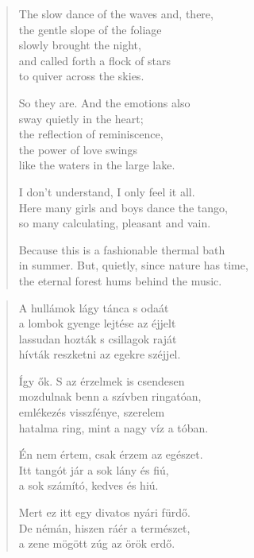 \documentclass[11pt]{book}
\newcommand*{\centeredornament}{\centerline{\pgfornament[width=6cm]{88}}}
\begin{document}
\begin{verse}
  The slow dance of the waves and, there, \\
  the gentle slope of the foliage \\
  slowly brought the night, \\
  and called forth a flock of stars  \\
  to quiver across the skies.

  So they are. And the emotions also \\
  sway quietly in the heart; \\
  the reflection of reminiscence, \\
  the power of love swings \\
  like the waters in the large lake.

  I don't understand, I only feel it all. \\
  Here many girls and boys dance the tango, \\
  so many calculating, pleasant and vain.

  Because this is a fashionable thermal bath \\
  in summer. But, quietly, since nature has time,\hspace*{-1mm} \\
  the eternal forest hums behind the music.
\end{verse}

\newpage

\vspace*{-15mm}
\centeredornament



\begin{verse}
  A hullámok lágy tánca s odaát \\
  a lombok gyenge lejtése az éjjelt \\
  lassudan hozták s csillagok raját \\
  hívták reszketni az egekre széjjel.

  Így ők. S az érzelmek is csendesen \\
  mozdulnak benn a szívben ringatóan, \\
  emlékezés visszfénye, szerelem \\
  hatalma ring, mint a nagy víz a tóban.

  Én nem értem, csak érzem az egészet. \\
  Itt tangót jár a sok lány és fiú, \\
  a sok számító, kedves és hiú.

  Mert ez itt egy divatos nyári fürdő. \\
  De némán, hiszen ráér a természet, \\
  a zene mögött zúg az örök erdő.
\end{verse}
\end{document}
